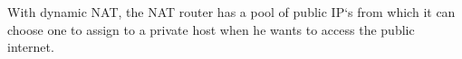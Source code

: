 With dynamic NAT, the NAT router has a pool of public IP`s from which it can choose one to assign to a private host when he wants to access the public internet.
